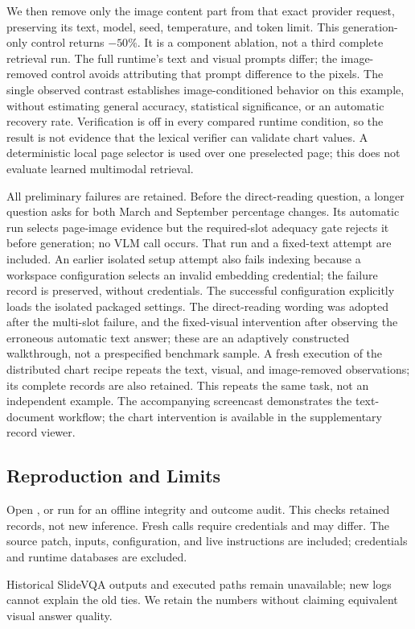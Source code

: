 We then remove only the image content part from that exact provider request, preserving its text, model, seed, temperature, and token limit. This generation-only control returns $-50\%$. It is a component ablation, not a third complete retrieval run. The full runtime's text and visual prompts differ; the image-removed control avoids attributing that prompt difference to the pixels. The single observed contrast establishes image-conditioned behavior on this example, without estimating general accuracy, statistical significance, or an automatic recovery rate. Verification is off in every compared runtime condition, so the result is not evidence that the lexical verifier can validate chart values. A deterministic local page selector is used over one preselected page; this does not evaluate learned multimodal retrieval.

All preliminary failures are retained. Before the direct-reading question, a longer question asks for both March and September percentage changes. Its automatic run selects page-image evidence but the required-slot adequacy gate rejects it before generation; no VLM call occurs. That run and a fixed-text attempt are included. An earlier isolated setup attempt also fails indexing because a workspace configuration selects an invalid embedding credential; the failure record is preserved, without credentials. The successful configuration explicitly loads the isolated packaged settings. The direct-reading wording was adopted after the multi-slot failure, and the fixed-visual intervention after observing the erroneous automatic text answer; these are an adaptively constructed walkthrough, not a prespecified benchmark sample. A fresh execution of the distributed chart recipe repeats the text, visual, and image-removed observations; its complete records are also retained. This repeats the same task, not an independent example. The accompanying screencast demonstrates the text-document workflow; the chart intervention is available in the supplementary record viewer.

\subsection{Reproduction and Limits}
Open , or run  for an offline integrity and outcome audit. This checks retained records, not new inference. Fresh calls require credentials and may differ. The source patch, inputs, configuration, and live instructions are included; credentials and runtime databases are excluded.

Historical SlideVQA outputs and executed paths remain unavailable; new logs cannot explain the old ties. We retain the numbers without claiming equivalent visual answer quality.
